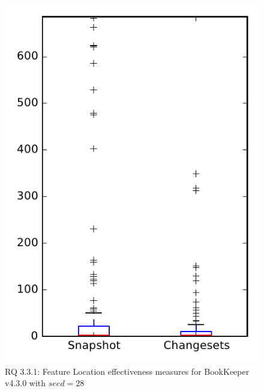 
\begin{figure}
\centering
\includegraphics[height=0.4\textheight]{figures/flt_seed/rq1_bookkeeper_28}
\caption{RQ 3.3.1: Feature Location effectiveness measures for BookKeeper v4.3.0 with $seed=28$}
\label{fig:flt_seed:rq1:bookkeeper}
\end{figure}
